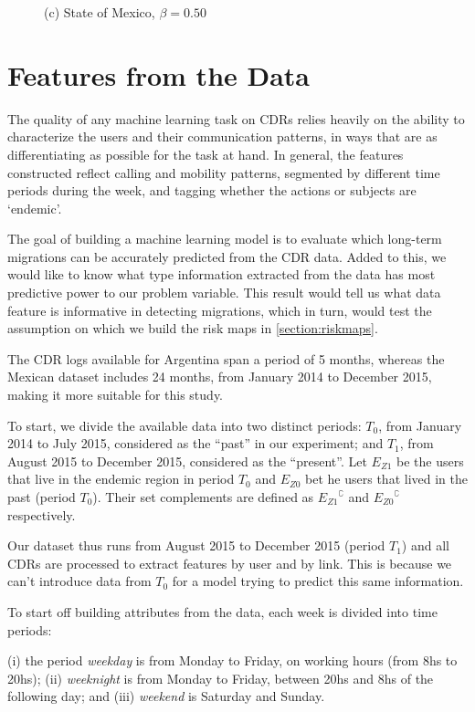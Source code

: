 \begin{figure}[ht!]
\begin{minipage}{.32\linewidth}
		(c) State of Mexico, $\beta = 0.50$
	\end{minipage}
\end{figure}

\newpage


\section{Features from the Data}

The quality of any machine learning task on CDRs relies heavily on the ability to characterize the users and their communication patterns, in ways that are as differentiating as possible for the task at hand.
In general, the features constructed reflect calling and mobility patterns,
segmented by different time periods during the week, and tagging whether the actions or subjects are `endemic'.

The goal of building a machine learning model is to evaluate which long-term migrations can be accurately predicted from the CDR data. Added to this, we would like to know what type information extracted from the data has most predictive power to our problem variable. This result would tell us what data feature is informative in detecting migrations, which in turn, would test the assumption on which we build the risk maps in \cref{section:riskmaps}.

The CDR logs available for Argentina span a period of 5 months,
whereas the Mexican dataset includes 24 months, from January 2014 to December 2015, making it more suitable for this study.

To start, we divide the available data into two distinct periods:
$T_0$, from January 2014 to July 2015, considered as the ``past'' in our experiment;
and $T_1$, from August 2015 to December 2015, considered as the ``present''. Let $E_{Z1}$ be the users that live in the endemic region in period $T_0$
and  $E_{Z0}$ bet he users that lived in the past (period $T_0$). Their set complements are defined as ${ E_{Z1} }^{\complement}$ and ${ E_{Z0} }^{\complement}$ respectively.

Our dataset thus runs from August 2015 to December 2015 (period $T_1$) and all CDRs are processed to extract features by user and by link. This is because we can't introduce data from $T_0$ for a model trying to predict this same information.

To start off building attributes from the data, each week is divided into time periods:
\begin{definition}\label{def:week-periods}
	(i) the period \textit{weekday} is from Monday to Friday, on working hours (from 8hs to 20hs); (ii) \textit{weeknight} is from Monday to Friday, between 20hs and 8hs of the following day;
	and (iii) \textit{weekend} is Saturday and Sunday.
\end{definition}


